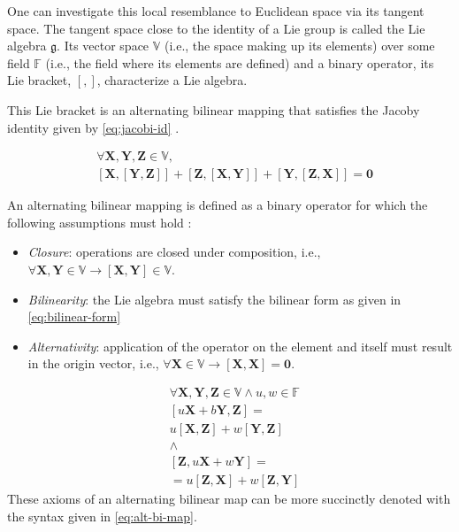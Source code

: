 \documentclass[headsepline, hidelinks, footsepline, footinclude=false, oneside, fontsize=11pt, paper=a4, listof=totoc, bibliography=totoc]{scrbook}
\begin{document}
One can investigate this local resemblance to Euclidean space via its tangent space.
The tangent space close to the identity of a Lie group is called the Lie algebra \(\mathfrak{g}\). 
Its vector space  \(\mathbb{V}\) (i.e., the space making up its elements) over some field \(\mathbb{F}\) (i.e., the field where its elements are defined) 
and a binary operator, its Lie bracket, \([,]\), characterize a Lie algebra.

This Lie bracket is an alternating bilinear mapping that satisfies the Jacoby identity given by \cref{eq:jacobi-id} \cite{hallLieGroupsLie2015}. 

\begin{equation}
\label{eq:jacobi-id}
\begin{split}
& \forall \mathbf{X}, \mathbf{Y}, \mathbf{Z} \in  \mathbb{V} , \\ 
& [\mathbf{X}, [\mathbf{Y}, \mathbf{Z}]] + [\mathbf{Z}, [\mathbf{X}, \mathbf{Y}]] + [\mathbf{Y}, [\mathbf{Z}, \mathbf{X}]] = \mathbf{0}
\end{split}
\end{equation}

\newpage
An alternating bilinear mapping is defined as a binary operator for which
the following assumptions must hold \cite{hallLieGroupsLie2015}:

\begin{itemize}
\item \emph{Closure}: operations are closed under composition, i.e.,  \(\forall \mathbf{X}, \mathbf{Y} \in \mathbb{V} \rightarrow [\mathbf{X}, \mathbf{Y}] \in \mathbb{V}\).
\item \emph{Bilinearity}: the Lie algebra must satisfy the bilinear form as given in \cref{eq:bilinear-form}
\item \emph{Alternativity}: application of the operator on the element and itself must result in the origin vector, i.e., \(\forall \mathbf{X} \in \mathbb{V} \rightarrow [\mathbf{X}, \mathbf{X}] = \mathbf{0}\).
\end{itemize}

\begin{equation}
\label{eq:bilinear-form}
\begin{split}
& \forall \mathbf{X}, \mathbf{Y}, \mathbf{Z} \in  \mathbb{V} \wedge u, w \in \mathbb{F}  \\
& [u\mathbf{X} + b\mathbf{Y}, \mathbf{Z}] = \\
& u[\mathbf{X}, \mathbf{Z}] + w[\mathbf{Y}, \mathbf{Z}] \\
& \wedge \\
& [\mathbf{Z}, u\mathbf{X} + w\mathbf{Y}] = \\ 
& = u[\mathbf{Z}, \mathbf{X}] + w[\mathbf{Z}, \mathbf{Y}]
\end{split}
\end{equation}
These axioms of an alternating bilinear map can be more
succinctly denoted with the syntax given in \cref{eq:alt-bi-map}.
\end{document}
